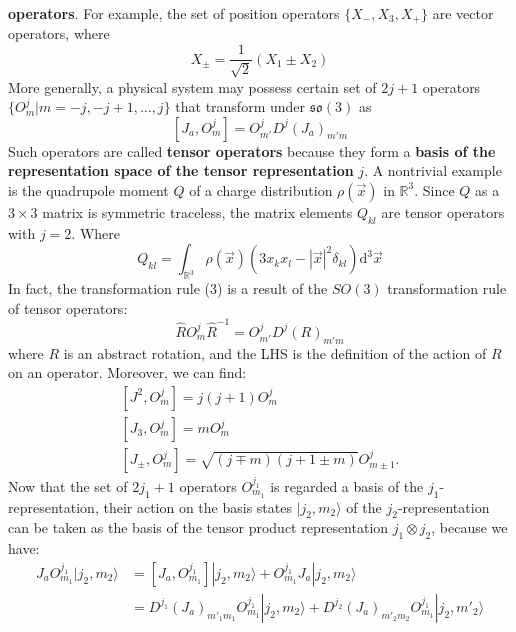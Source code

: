 \documentclass{article}
\begin{document}
	\textbf{operators}. For example, the set of position operators $\{X_{-} ,X_{3} ,X_{+}\}$ are vector operators, where
	\begin{equation*}
		X_{\pm } =\frac{1}{\sqrt{2}}( X_{1} \pm X_{2})
	\end{equation*}
	More generally, a physical system may possess certain set of $2j+1$ operators $\{O_{m}^{j} | m=-j,-j+1,\dotsc ,j\}$ that transform under $\mathfrak{so} (3)$ as
	\begin{equation}
		\left[ J_{a} ,O_{m}^{j}\right] =O_{m'}^{j} D^{j}( J_{a})_{m' m}
	\end{equation}
	Such operators are called \textbf{tensor operators} because they form a \textbf{basis of the representation space of the tensor representation }$j$. A nontrivial example is the quadrupole moment $Q$ of a charge distribution $\rho (\vec{x} )$ in $\mathbb{R}^{3}$. Since $Q$ as a $3\times 3$ matrix is symmetric traceless, the matrix elements $Q_{kl}$ are tensor operators with $j=2$. Where
	\begin{equation*}
		Q_{kl} =\int _{\mathbb{R}^{3}} \rho (\vec{x})\left( 3x_{k} x_{l} -| \vec{x}| ^{2} \delta _{kl}\right)\mathrm{d}^{3}\vec{x}
	\end{equation*}
	In fact, the transformation rule (3) is a result of the $SO( 3)$ transformation rule of tensor operators:
	\begin{equation*}
		\hat{R} O_{m}^{j}\hat{R}^{-1} =O_{m'}^{j} D^{j} (R)_{m'm}
	\end{equation*}
	where $R$ is an abstract rotation, and the LHS is the definition of the action of $R$ on an operator. Moreover, we can find:
	\begin{equation}
		\begin{array}{ l }
			\left[ J^{2} ,O_{m}^{j}\right] =j(j+1)O_{m}^{j}\\
			\left[ J_{3} ,O_{m}^{j}\right] =mO_{m}^{j}\\
			\left[ J_{\pm } ,O_{m}^{j}\right] =\sqrt{(j\mp m)(j+1\pm m)} O_{m\pm 1}^{j} .
		\end{array}
	\end{equation}
	Now that the set of $2j_{1} +1$ operators $O_{m_{1}}^{j_{1}}$ is regarded a basis of the $j_{1}$-representation, their action on the basis states $| j_{2} ,m_{2}\rangle  $ of the $j_{2}$-representation can be taken as the basis of the tensor product representation $j_{1} \otimes j_{2}$, because we have:
	\begin{equation*}
		\begin{aligned}
			J_{a} O_{m_{1}}^{j_{1}}| j_{2} ,m_{2}\rangle   & =\left[ J_{a} ,O_{m_{1}}^{j_{1}}\right]| j_{2} ,m_{2}\rangle  +O_{m_{1}}^{j_{1}} J_{a}| j_{2} ,m_{2}\rangle  \\
			& =D^{j_{1}}( J_{a})_{m'_{1} m_{1}} O_{m_{1}}^{j_{1}}| j_{2} ,m_{2}\rangle  +D^{j_{2}}( J_{a})_{m'_{2} m_{2}} O_{m_{1}}^{j_{1}}| j_{2} ,m'_{2}\rangle  
		\end{aligned}
	\end{equation*}
\end{document}

